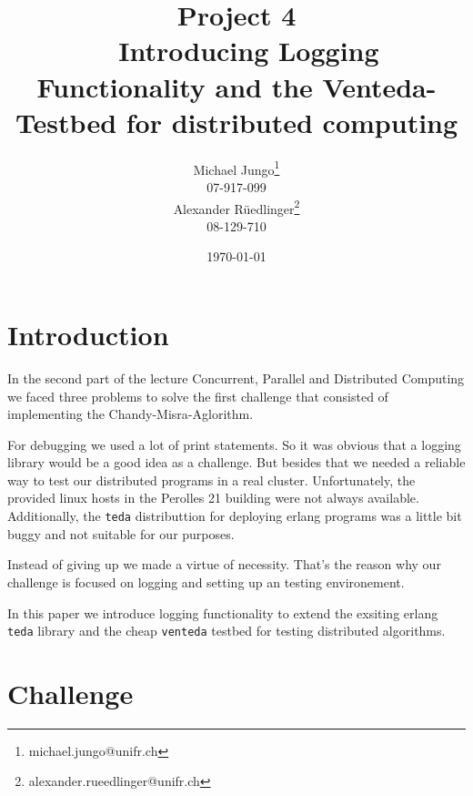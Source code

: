 \documentclass[10pt,a4paper]{article}
\begin{document}
\onehalfspacing 
\begin{titlepage}
\author{Michael Jungo\footnote{michael.jungo@unifr.ch} \\ 07-917-099 \\ Alexander Rüedlinger\footnote{alexander.rueedlinger@unifr.ch} \\ 08-129-710\\ }
\title{Project 4 \\ \ \vspace{0.5em} Introducing Logging Functionality and the Venteda-Testbed for distributed computing }

\date{\today}
\maketitle
\end{titlepage}

\tableofcontents
{} %
\newpage
{} %
\section{Introduction}
In the second part of the lecture Concurrent, Parallel and Distributed Computing we faced three problems to solve the first challenge that consisted of implementing the Chandy-Misra-Aglorithm.

For debugging we used a lot of print statements. So it was obvious that a logging library would be a good idea as a challenge. But besides that we needed a reliable way to test our distributed programs in a real cluster. Unfortunately, the provided linux hosts in the Perolles 21 building were not always available. Additionally, the \texttt{teda} distributtion for deploying erlang programs was a little bit buggy and not suitable for our purposes.

Instead of giving up we made a virtue of necessity. That's the reason why our challenge is focused on logging and setting up an testing environement.

In this paper we introduce logging functionality to extend the exsiting erlang \texttt{teda} library and the cheap \texttt{venteda} testbed for testing distributed algorithms.


\section{Challenge}
\end{document}

